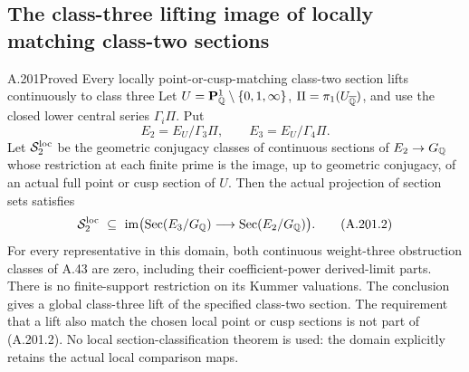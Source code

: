 \subsection{The class-three lifting image of locally matching class-two sections}

\begin{statement}{A.201}{Proved}
{Every locally point-or-cusp-matching class-two section lifts continuously to class three}
Let \(U=\mathbf P^1_\Q\setminus\{0,1,\infty\}\),
\(\Pi=\pi_1(U_{\overline\Q})\), and use the closed lower
central series \(\Gamma_i\Pi\).  Put
\[
 E_2=E_U/\Gamma_3\Pi,\qquad E_3=E_U/\Gamma_4\Pi.
\tag{A.201.1}
\]
Let \(\mathscr S^{\rm loc}_2\) be the geometric conjugacy
classes of continuous sections of \(E_2\to G_\Q\) whose
restriction at each finite prime is the image, up to geometric
conjugacy, of an actual full point or cusp section of \(U\).
Then the actual projection of section sets satisfies
\[
 \mathscr S^{\rm loc}_2\ \subseteq\
 \operatorname{im}\bigl(\operatorname{Sec}(E_3/G_\Q)
                  \longrightarrow\operatorname{Sec}(E_2/G_\Q)\bigr).
\tag{A.201.2}
\]
For every representative in this domain, both continuous
weight-three obstruction classes of A.43 are zero, including
their coefficient-power derived-limit parts.  There is no
finite-support restriction on its Kummer valuations.
The conclusion gives a global class-three lift of the specified
class-two section.  The requirement that a lift also match the
chosen local point or cusp sections is not part of (A.201.2).
No local section-classification theorem is used: the domain
explicitly retains the actual local comparison maps.
\end{statement}

